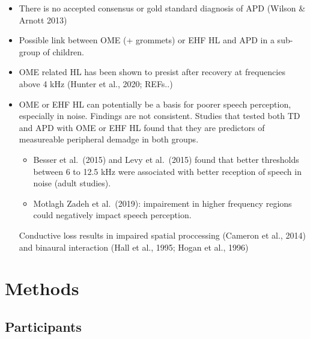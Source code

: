 \documentclass[a4paper, twoside]{templates/ociamthesis}
\providecommand{\tightlist}{%
  \setlength{\itemsep}{0pt}\setlength{\parskip}{0pt}}
\begin{document}
\begin{itemize}
\item
  There is no accepted consensus or gold standard diagnosis of APD (Wilson \& Arnott 2013)
\item
  Possible link between OME (+ grommets) or EHF HL and APD in a sub-group of children.
\item
  OME related HL has been shown to presist after recovery at frequencies above 4 kHz (Hunter et al., 2020; REFs..)
\item
  OME or EHF HL can potentially be a basis for poorer speech perception, especially in noise. Findings are not consistent. Studies that tested both TD and APD with OME or EHF HL found that they are predictors of measureable peripheral demadge in both groups.

  \begin{itemize}
  \tightlist
  \item
    Besser et al.~(2015) and Levy et al.~(2015) found that better thresholds between 6 to 12.5 kHz were associated with better reception of speech in noise (adult studies).
  \item
    Motlagh Zadeh et al.~(2019): impairement in higher frequency regions could negatively impact speech perception.
  \end{itemize}

  Conductive loss results in impaired spatial proccessing (Cameron et al., 2014) and binaural interaction (Hall et al., 1995; Hogan et al., 1996)
\end{itemize}

\hypertarget{methods-4}{%
\section{Methods}\label{methods-4}}

\hypertarget{participants}{%
\subsection{Participants}\label{participants}}
\end{document}

